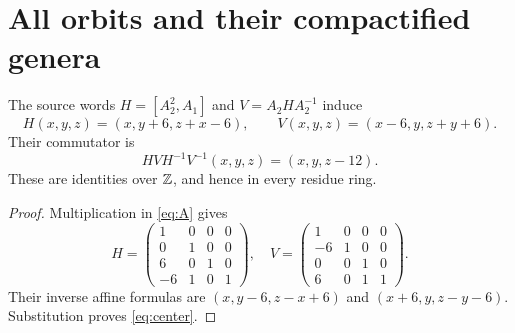 \section{All orbits and their compactified genera}
\begin{lemma}\label{lem:shears}
The source words $H=[A_2^2,A_1]$ and $V=A_2HA_2^{-1}$ induce
\[
 H(x,y,z)=(x,y+6,z+x-6),\qquad
 V(x,y,z)=(x-6,y,z+y+6).
\]
Their commutator is
\begin{equation}\label{eq:center}
 HVH^{-1}V^{-1}(x,y,z)=(x,y,z-12).
\end{equation}
These are identities over $\mathbb Z$, and hence in every residue ring.
\end{lemma}
\begin{proof}
Multiplication in \eqref{eq:A} gives
\[
H=\begin{pmatrix}1&0&0&0\\0&1&0&0\\6&0&1&0\\-6&1&0&1\end{pmatrix},\quad
V=\begin{pmatrix}1&0&0&0\\-6&1&0&0\\0&0&1&0\\6&0&1&1\end{pmatrix}.
\]
Their inverse affine formulas are $(x,y-6,z-x+6)$ and
$(x+6,y,z-y-6)$. Substitution proves \eqref{eq:center}.
\end{proof}

